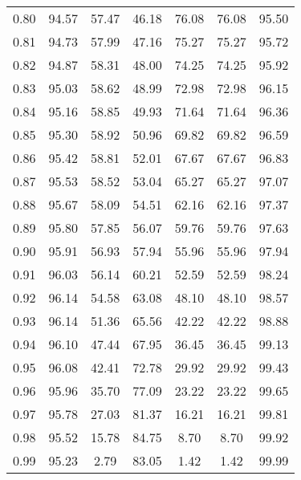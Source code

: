 \begin{tabular}{|c|c|c|c|c|c|c|}
      0.80 &     94.57 &     57.47 &      46.18 &   76.08 &      76.08 &         95.50 \\
      0.81 &     94.73 &     57.99 &      47.16 &   75.27 &      75.27 &         95.72 \\
      0.82 &     94.87 &     58.31 &      48.00 &   74.25 &      74.25 &         95.92 \\
      0.83 &     95.03 &     58.62 &      48.99 &   72.98 &      72.98 &         96.15 \\
      0.84 &     95.16 &     58.85 &      49.93 &   71.64 &      71.64 &         96.36 \\
      0.85 &     95.30 &     58.92 &      50.96 &   69.82 &      69.82 &         96.59 \\
      0.86 &     95.42 &     58.81 &      52.01 &   67.67 &      67.67 &         96.83 \\
      0.87 &     95.53 &     58.52 &      53.04 &   65.27 &      65.27 &         97.07 \\
      0.88 &     95.67 &     58.09 &      54.51 &   62.16 &      62.16 &         97.37 \\
      0.89 &     95.80 &     57.85 &      56.07 &   59.76 &      59.76 &         97.63 \\
      0.90 &     95.91 &     56.93 &      57.94 &   55.96 &      55.96 &         97.94 \\
      0.91 &     96.03 &     56.14 &      60.21 &   52.59 &      52.59 &         98.24 \\
      0.92 &     96.14 &     54.58 &      63.08 &   48.10 &      48.10 &         98.57 \\
      0.93 &     96.14 &     51.36 &      65.56 &   42.22 &      42.22 &         98.88 \\
      0.94 &     96.10 &     47.44 &      67.95 &   36.45 &      36.45 &         99.13 \\
      0.95 &     96.08 &     42.41 &      72.78 &   29.92 &      29.92 &         99.43 \\
      0.96 &     95.96 &     35.70 &      77.09 &   23.22 &      23.22 &         99.65 \\
      0.97 &     95.78 &     27.03 &      81.37 &   16.21 &      16.21 &         99.81 \\
      0.98 &     95.52 &     15.78 &      84.75 &    8.70 &       8.70 &         99.92 \\
      0.99 &     95.23 &      2.79 &      83.05 &    1.42 &       1.42 &         99.99 \\
\bottomrule
\end{tabular}
